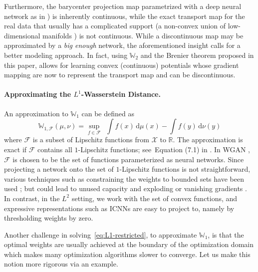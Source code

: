 \documentclass[10pt]{article}
\newcommand{\ud}{\,\mathrm{d}}
\newcommand{\W}{\mathds{W}}
\newcommand{\calF}{\mathcal{F}}
\newcommand{\calX}{\mathcal{X}}
\numberwithin{equation}{section}
\begin{document}
Furthermore, the barycenter projection map parametrized with a deep neural network as in \citet{seguy2017large}) is inherently continuous, while the exact transport map  for the real data that usually has a complicated support (a non-convex union of low-dimensional manifolds \citep{arjovsky2017wasserstein,guo2019mode}) is not continuous. While a discontinuous map may be approximated by a {\em big enough} network, the aforementioned insight calls for a better modeling approach. In fact, using $\W_2$ and the Brenier theorem proposed in this paper, allows for learning convex (continuous) potentials whose gradient mapping are now to represent the transport map and can be discontinuous.


\paragraph{Approximating the $L^1$-Wasserstein Distance.}
An approximation to $\W_1$ can be defined as
\begin{equation}\label{eq:L1-restricted}
\W_{1,\calF}(\mu,\nu) = \sup_{f \in \calF}~~ \int f(x) \ud \mu(x) - \int f(y) \ud \nu(y)
\end{equation} 
where $\calF$ is a subset of Lipschitz functions from $\calX$ to $\mathbb{R}$. The approximation is exact if $\calF$ contains all $1$-Lipschitz functions; see~Equation (7.1) in \citet{villani2003topics}. In WGAN \citep{arjovsky2017wasserstein}, $\calF$ is chosen to be the set of functions parameterized as neural networks. Since projecting a network onto the set of $1$-Lipschitz functions is not straightforward, various techniques such as constraining the weights to bounded sets have been used \citep{gulrajani2017improved, salimans2018improving,wei2018improving}; but could lead to unused capacity and exploding or vanishing gradients \cite[Section 3]{gulrajani2017improved}. In contrast, in the $L^2$ setting, we work with the set of convex functions, and expressive representations such as ICNNs are easy to project to, namely by thresholding weights by zero. 

Another challenge in solving~\eqref{eq:L1-restricted}, to approximate $\W_1$, 
is that the optimal weights are usually achieved at the boundary of the optimization domain which makes many optimization algorithms slower to converge. Let us make this notion more rigorous via an example. 
\end{document}
